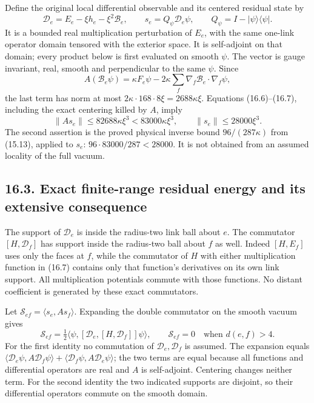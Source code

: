 \documentclass[
]{article}
\begin{document}
Define the original local differential observable and its centered
residual state by \[
\mathscr D_e=E_e-\xi h_e-\xi^2\mathcal B_e,\qquad
s_e=Q_\psi\mathscr D_e\psi,\qquad
Q_\psi=I-|\psi\rangle\langle\psi|.                            \tag{16.7}
\] It is a bounded real multiplication perturbation of \(E_e\), with the
same one-link operator domain tensored with the exterior space. It is
self-adjoint on that domain; every product below is first evaluated on
smooth \(\psi\). The vector is gauge invariant, real, smooth and
perpendicular to the same \(\psi\). Since \[
A(\mathcal B_e\psi)
 =\kappa F_e\psi
       -2\kappa\sum_f\nabla_f\mathcal B_e\cdot\nabla_f\psi ,
\] the last term has norm at most
\(2\kappa\cdot168\cdot8\xi=2688\kappa\xi\). Equations (16.6)--(16.7),
including the exact centering killed by \(A\), imply \[
\|As_e\|\le82688\kappa\xi^3<83000\kappa\xi^3,\qquad
\|s_e\|\le28000\xi^3.                                       \tag{16.8}
\] The second assertion is the proved physical inverse bound
\(96/(287\kappa)\) from (15.13), applied to \(s_e\):
\(96\cdot83000/287<28000\). It is not obtained from an assumed locality
of the full vacuum.

\subsection{16.3. Exact finite-range residual energy and its extensive
consequence}\label{exact-finite-range-residual-energy-and-its-extensive-consequence}

The support of \(\mathscr D_e\) is inside the radius-two link ball about
\(e\). The commutator \([H,\mathscr D_f]\) has support inside the
radius-two ball about \(f\) as well. Indeed \([H,E_f]\) uses only the
faces at \(f\), while the commutator of \(H\) with either multiplication
function in (16.7) contains only that function's derivatives on its own
link support. All multiplication potentials commute with those
functions. No distant coefficient is generated by these exact
commutators.

Let \(\mathcal S_{ef}=\langle s_e,As_f\rangle\). Expanding the double
commutator on the smooth vacuum gives \[
\mathcal S_{ef}
 =\tfrac12\langle\psi,[\mathscr D_e,[H,\mathscr D_f]]\psi\rangle,
\qquad
\mathcal S_{ef}=0\quad\text{when }d(e,f)>4.                  \tag{16.9}
\] For the first identity no commutation of
\(\mathscr D_e,\mathscr D_f\) is assumed. The expansion equals
\(\langle\mathscr D_e\psi,A\mathscr D_f\psi\rangle+
 \langle\mathscr D_f\psi,A\mathscr D_e\psi\rangle\); the two terms are
equal because all functions and differential operators are real and
\(A\) is self-adjoint. Centering changes neither term. For the second
identity the two indicated supports are disjoint, so their differential
operators commute on the smooth domain.
\end{document}
